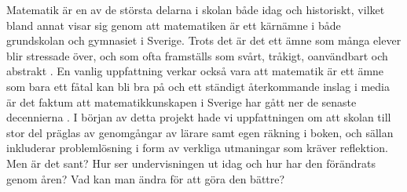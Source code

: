 \textcolor{lila}{Matematik är en av de största delarna i skolan både idag och historiskt, vilket bland annat visar sig genom att matematiken är ett kärnämne i både grundskolan och gymnasiet i Sverige. Trots det är det ett ämne som många elever blir stressade över, och som ofta framställs som svårt, tråkigt, oanvändbart och abstrakt \cite{Ignacio&Barona}. En vanlig uppfattning verkar också vara att matematik är ett ämne som bara ett fåtal kan bli bra på \cite{Skolverket03} och ett ständigt återkommande inslag i media är det faktum att matematikkunskapen i Sverige har gått ner de senaste decennierna \cite{CompareOECD}.
I början av detta projekt hade vi uppfattningen om att skolan till stor del präglas av genomgångar av lärare samt egen räkning i boken, och sällan inkluderar problemlösning i form av verkliga utmaningar som kräver reflektion. Men är det sant? Hur ser undervisningen ut idag och hur har den förändrats genom åren? Vad kan man ändra för att göra den bättre?}
